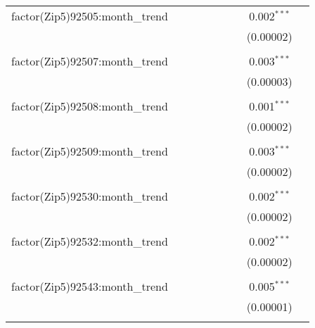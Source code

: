 \begin{table}[H]
{\begin{tabular}{@{\extracolsep{5pt}}lcccccccc}
  factor(Zip5)92505:month\_trend &  &  &  &  &  &  & 0.002$^{***}$ &  \\  

   &  &  &  &  &  &  & (0.00002) &  \\  

   & & & & & & & & \\  

  factor(Zip5)92507:month\_trend &  &  &  &  &  &  & 0.003$^{***}$ &  \\  

   &  &  &  &  &  &  & (0.00003) &  \\  

   & & & & & & & & \\  

  factor(Zip5)92508:month\_trend &  &  &  &  &  &  & 0.001$^{***}$ &  \\  

   &  &  &  &  &  &  & (0.00002) &  \\  

   & & & & & & & & \\  

  factor(Zip5)92509:month\_trend &  &  &  &  &  &  & 0.003$^{***}$ &  \\  

   &  &  &  &  &  &  & (0.00002) &  \\  

   & & & & & & & & \\  

  factor(Zip5)92530:month\_trend &  &  &  &  &  &  & 0.002$^{***}$ &  \\  

   &  &  &  &  &  &  & (0.00002) &  \\  

   & & & & & & & & \\  

  factor(Zip5)92532:month\_trend &  &  &  &  &  &  & 0.002$^{***}$ &  \\  

   &  &  &  &  &  &  & (0.00002) &  \\  

   & & & & & & & & \\  

  factor(Zip5)92543:month\_trend &  &  &  &  &  &  & 0.005$^{***}$ &  \\  

   &  &  &  &  &  &  & (0.00001) &  \\  

   & & & & & & & & \\  


\end{tabular}}
\end{table}
